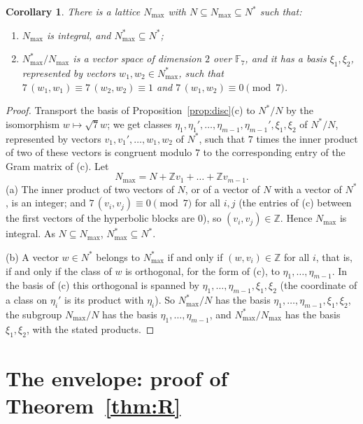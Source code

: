 \documentclass[11pt,a4paper]{article}
\newtheorem{corollary}[theorem]{Corollary}
\theoremstyle{definition}
\theoremstyle{remark}
\newcommand{\ZZ}{\mathbb{Z}}
\newcommand{\FF}{\mathbb{F}}
\begin{document}
\begin{corollary}\label{cor:Nmax}
There is a lattice $N_{\max}$ with $N\subseteq N_{\max}\subseteq N^*$ such that:
\begin{enumerate}[label=\textup{(\alph*)}]
\item $N_{\max}$ is integral, and $N_{\max}^*\subseteq N^*$;
\item $N_{\max}^*/N_{\max}$ is a vector space of dimension $2$ over $\FF_7$, and it has a basis $\xi_1,\xi_2$,
represented by vectors $w_1,w_2\in N_{\max}^*$, such that
$7\,(w_1,w_1)\equiv7\,(w_2,w_2)\equiv1$ and $7\,(w_1,w_2)\equiv0\pmod7$.
\end{enumerate}
\end{corollary}
\begin{proof}
Transport the basis of Proposition~\ref{prop:disc}(c) to $N^*/N$ by the isomorphism $w\mapsto\sqrt7w$; we get
classes $\eta_1,\eta_1',\dots,\eta_{m-1},\eta_{m-1}',\xi_1,\xi_2$ of $N^*/N$, represented by vectors
$v_1,v_1',\dots,w_1,w_2$ of $N^*$, such that $7$ times the inner product of two of these vectors is congruent modulo
$7$ to the corresponding entry of the Gram matrix of (c). Let
\[
N_{\max}=N+\ZZ v_1+\dots+\ZZ v_{m-1}.
\]
(a) The inner product of two vectors of $N$, or of a vector of $N$ with a vector of $N^*$, is an integer; and
$7\,(v_i,v_j)\equiv0\pmod7$ for all $i,j$ (the entries of (c) between the first vectors of the hyperbolic blocks are
$0$), so $(v_i,v_j)\in\ZZ$. Hence $N_{\max}$ is integral. As $N\subseteq N_{\max}$, $N_{\max}^*\subseteq N^*$.

(b) A vector $w\in N^*$ belongs to $N_{\max}^*$ if and only if $(w,v_i)\in\ZZ$ for all $i$, that is, if and only if
the class of $w$ is orthogonal, for the form of (c), to $\eta_1,\dots,\eta_{m-1}$. In the basis of (c) this
orthogonal is spanned by $\eta_1,\dots,\eta_{m-1},\xi_1,\xi_2$ (the coordinate of a class on $\eta_i'$ is its
product with $\eta_i$). So $N_{\max}^*/N$ has the basis $\eta_1,\dots,\eta_{m-1},\xi_1,\xi_2$, the subgroup
$N_{\max}/N$ has the basis $\eta_1,\dots,\eta_{m-1}$, and $N_{\max}^*/N_{\max}$ has the basis $\xi_1,\xi_2$, with
the stated products.
\end{proof}

\section{The envelope: proof of Theorem~\ref{thm:R}}\label{sec:env}
\end{document}
